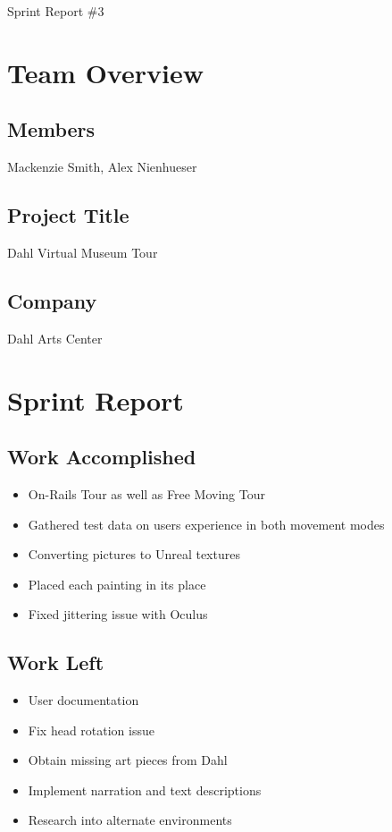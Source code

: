 \documentclass[11pt]{book}
\begin{document}
{\fontsize{16}{16}\selectfont Sprint Report \#3}

\section*{Team Overview}
\hrulefill
\subsection*{Members}
Mackenzie Smith, Alex Nienhueser

\subsection*{Project Title}
Dahl Virtual Museum Tour

\subsection*{Company}
Dahl Arts Center


\section*{Sprint Report}
\hrulefill
\subsection*{Work Accomplished}
\begin{itemize}
\item On-Rails Tour as well as Free Moving Tour
\item Gathered test data on users experience in both movement modes
\item Converting pictures to Unreal textures
\item Placed each painting in its place
\item Fixed jittering issue with Oculus

\end{itemize}
\subsection*{Work Left}
\begin{itemize}
\item User documentation
\item Fix head rotation issue
\item Obtain missing art pieces from Dahl
\item Implement narration and text descriptions
\item Research into alternate environments
\end{itemize}
\end{document}

